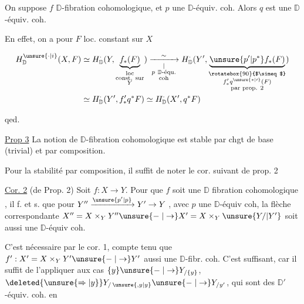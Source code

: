 
On suppose $f$ $\mathbb D$-fibration cohomologique, et $p$ une $\mathbb D$-équiv. coh. Alors $q$ est une $\mathbb D$-équiv. coh.


En effet, on a pour $F$ loc. constant sur $X$

\[
\begin{aligned}
H^{\unsure{\cdot|i}}_{\mathbb D}(X,F)&\simeq H^{\cdot}_{\mathbb D}(Y,\underbrace{f_*(F)}_{\substack{\text{loc}\\\text{const. sur}\\Y}})
\xrightarrow[\substack{|\\ p\ \mathbb D\text{-équ.}\\\text{coh}}]{\sim}
H^{\cdot}_{\mathbb D}(Y',\underbrace{\unsure{p'|p^*}f_*(F)}_{\substack{\rotatebox{90}{$\simeq$}\\ f'_*q^{\unsure{*|\prime}}(F)\\\text{par prop. 2}}})\\
&\simeq H^{\cdot}_{\mathbb D}(Y',f'_*q^*F)\simeq H^{\cdot}_{\mathbb D}(X',q^*F)
\end{aligned}
\]

qed.

\uline{Prop 3} La notion de $\mathbb D$-fibration cohomologique  est stable par chgt de base (trivial) et par composition.

 Pour la stabilité par composition, il suffit de  noter le cor. suivant de prop. 2

\uline{Cor. 2} (de Prop. 2) Soit $f:X\to Y$. Pour que $f$ soit une $\mathbb D$ fibration cohomologique , il f. et s. que pour $Y''\xrightarrow{\unsure{p'|p}}Y'\to Y$ , avec $p$ une $\mathbb D$-équiv coh, la flèche correspondante $X''=X\times_Y Y''\unsure{\relbar|\to}X'=X\times_Y\unsure{Y/|Y'}$ soit aussi une $\mathbb D$-équiv coh.

C'est nécessaire par le cor. 1, compte tenu que $f':X'=X\times_Y Y'\unsure{\relbar|\to}Y'$  aussi une $\mathbb D$-fibr. coh. C'est suffisant, car il suffit de l'appliquer aux cas $\{y\}\unsure{\relbar|\to}Y_{/\{y\}}$, $\deleted{\unsure{\Rightarrow|y}}Y_{/\,\unsure{,y|y}}\unsure{\relbar|\to}Y_{/y'}$, qui sont des $\mathbb D'$-équiv. coh. en


